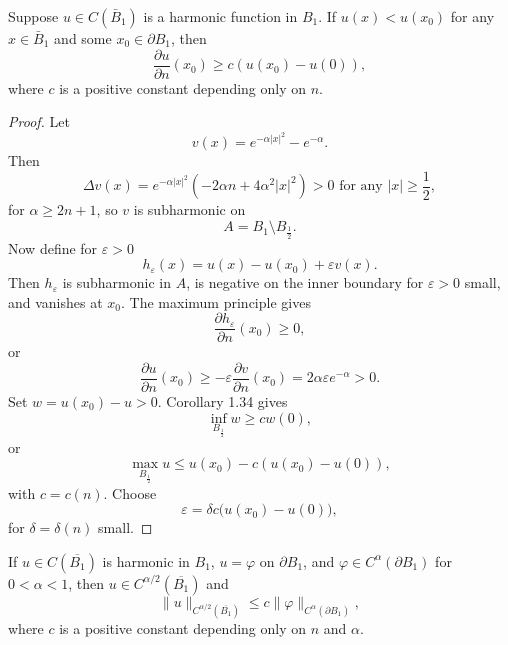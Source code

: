 \begin{theorem}\label{hanlin:thm-hopf}
Suppose $u \in C(\bar{B}_1)$ is a harmonic function in $B_1$. If $u(x) < u(x_0)$ for any $x \in \bar{B}_1$ and some $x_0 \in \partial B_1$, then
\[
\frac{\partial u}{\partial n}(x_0) \ge c(u(x_0) - u(0)),
\]
where $c$ is a positive constant depending only on $n$.
\end{theorem}

\begin{proof}
\sketch Let
\[
v(x) = e^{-\alpha |x|^2} - e^{-\alpha}.
\]
Then
\[
\Delta v(x) = e^{-\alpha |x|^2}(-2\alpha n + 4\alpha^2|x|^2) > 0 \text{ for any } |x| \ge \frac{1}{2},
\]
for $\alpha\ge2n+1$, so $v$ is subharmonic on
\[
A = B_1 \setminus B_{\frac{1}{2}}.
\]
Now define for $\varepsilon > 0$
\[
h_\varepsilon(x) = u(x) - u(x_0) + \varepsilon v(x).
\]
Then $h_\varepsilon$ is subharmonic in $A$, is negative on the inner boundary for
$\varepsilon>0$ small, and vanishes at $x_0$. The maximum principle gives
\[
\frac{\partial h_\varepsilon}{\partial n}(x_0) \ge 0,
\]
or
\[
\frac{\partial u}{\partial n}(x_0) \ge -\varepsilon \frac{\partial v}{\partial n}(x_0) = 2\alpha \varepsilon e^{-\alpha} > 0.
\]
Set $w=u(x_0)-u>0$. Corollary 1.34 gives
\[
\inf_{B_{\frac{1}{2}}} w \ge c w(0),
\]
or
\[
\max_{B_{\frac{1}{2}}} u \le u(x_0) - c(u(x_0) - u(0)),
\]
with $c=c(n)$. Choose
\[
\varepsilon = \delta c\bigl(u(x_0)-u(0)\bigr),
\]
for $\delta=\delta(n)$ small.
\end{proof}

\begin{lemma}\label{hanlin:lemma-holder-boundary}
If $u \in C(\overline{B_1})$ is harmonic in $B_1$, $u=\varphi$ on $\partial B_1$,
and $\varphi \in C^\alpha(\partial B_1)$ for $0<\alpha<1$, then
$u \in C^{\alpha/2}(\overline{B_1})$ and
\[
\|u\|_{C^{\alpha/2}(\overline{B_1})} \le c\|\varphi\|_{C^\alpha(\partial B_1)},
\]
where $c$ is a positive constant depending only on $n$ and $\alpha$.
\end{lemma}

